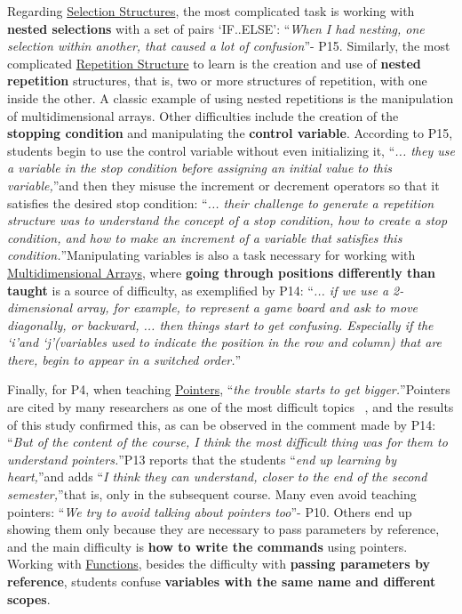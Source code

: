 \documentclass[sigconf]{acmart}
\begin{document}
Regarding \underline{Selection Structures}, the most complicated task is working with \textbf{nested selections} with a set of pairs \textquoteleft{IF..ELSE}\textquoteright: \textquotedblleft \textit{When I had nesting, one selection within another, that caused a lot of confusion}\textquotedblright \space - P15. 
Similarly, the most complicated \underline{Repetition Structure} to learn is the creation and use of \textbf{nested repetition} structures, that is, two or more structures of repetition, with one inside the other. A classic example of using nested repetitions is the manipulation of multidimensional arrays. Other difficulties include the creation of the \textbf{stopping condition} and manipulating the \textbf{control variable}. According to P15, students begin to use the control variable without even initializing it, \textquotedblleft \textit{... they use a variable in the stop condition before assigning an initial value to this variable,}\textquotedblright \space and then they misuse the increment or decrement operators so that it satisfies the desired stop condition: \textquotedblleft \textit{... their challenge to generate a repetition structure was to understand the concept of a stop condition, how to create a stop condition, and how to make an increment of a variable that satisfies this condition.}\textquotedblright \space Manipulating variables is also a task necessary for working with \underline{Multidimensional Arrays}, where \textbf{going through positions differently than taught} is a source of difficulty, as exemplified by P14: \textquotedblleft \textit{... if we use a 2-dimensional array, for example, to represent a game board and ask to move diagonally, or backward, ... then things start to get confusing. Especially if the \textquoteleft{i}\textquoteright \space and \textquoteleft{j}\textquoteright \space (variables used to indicate the position in the row and column) that are there, begin to appear in a switched order.}\textquotedblright

Finally, for P4, when teaching \underline{Pointers}, \textquotedblleft \textit{the trouble starts to get bigger.}\textquotedblright \space Pointers are cited by many researchers as one of the most difficult topics ~\cite{Mhashi13,Piteira13,Sevella13}, and the results of this study confirmed this, as can be observed in the comment made by P14: \textquotedblleft \textit{But of the content of the course, I think the most difficult thing was for them to understand pointers.}\textquotedblright \space P13 reports that the students \textquotedblleft \textit{end up learning by heart,}\textquotedblright \space and adds \textquotedblleft \textit{I think they can understand, closer to the end of the second semester,}\textquotedblright \space that is, only in the subsequent course. Many even avoid teaching pointers: \textquotedblleft \textit{We try to avoid talking about pointers too}\textquotedblright \space - P10. Others end up showing them only because they are necessary to pass parameters by reference, and the main difficulty is \textbf{how to write the commands} using pointers. Working with \underline{Functions}, besides the difficulty with \textbf{passing parameters by reference}, students confuse \textbf{variables with the same name and different scopes}. 
\end{document}
